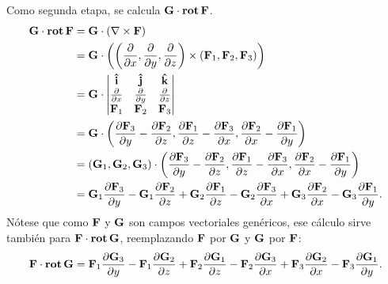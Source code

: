 \documentclass{fmbvecto}
\begin{document}
\begin{problema}
Como segunda etapa, se calcula \(\boldsymbol{{\mathbf{G}}}\cdot \operatorname{\mathbf{rot}}\boldsymbol{{\mathbf{F}}}\). 
\begin{align*}
    \bvec{G}\cdot \rot\bvec{F} &= \bvec{G} \cdot \left( \nabla \times \bvec{F} \right) \\
    &= \bvec{G} \cdot \left( \left(\frac{\partial}{\partial x},\frac{\partial}{\partial y},\frac{\partial}{\partial z}\right) \times (\bvec{F}_1, \bvec{F}_2, \bvec{F}_3) \right)\\
    &= \bvec{G} \cdot \begin{vmatrix}
        \uvec{i} & \uvec{j} & \uvec{k} \\
        \frac{\partial}{\partial x} & \frac{\partial}{\partial y} & \frac{\partial}{\partial z} \\
        \bvec{F}_1 & \bvec{F}_2 & \bvec{F}_3 \\
    \end{vmatrix} \\
    &= \bvec{G} \cdot \left( \frac{\partial \bvec{F}_3}{\partial y} - \frac{\partial \bvec{F}_2}{\partial z}, \frac{\partial \bvec{F}_1 }{\partial z} - \frac{\partial \bvec{F}_3}{\partial x}, \frac{\partial \bvec{F}_2}{\partial x} - \frac{\partial \bvec{F}_1 }{\partial y} \right) \\
    &= (\bvec{G}_1, \bvec{G}_2, \bvec{G}_3) \cdot \left( \frac{\partial \bvec{F}_3}{\partial y} - \frac{\partial \bvec{F}_2}{\partial z}, \frac{\partial \bvec{F}_1 }{\partial z} - \frac{\partial \bvec{F}_3}{\partial x}, \frac{\partial \bvec{F}_2}{\partial x} - \frac{\partial \bvec{F}_1 }{\partial y} \right) \\
    &= \bvec{G}_1 \frac{\partial \bvec{F}_3}{\partial y} - \bvec{G}_1\frac{\partial \bvec{F}_2}{\partial z} + \bvec{G}_2\frac{\partial \bvec{F}_1}{\partial z} - \bvec{G}_2\frac{\partial \bvec{F}_3}{\partial x} + \bvec{G}_3\frac{\partial \bvec{F}_2}{\partial x} - \bvec{G}_3\frac{\partial \bvec{F}_1}{\partial y}.
\end{align*}
Nótese que como \(\boldsymbol{{\mathbf{F}}}\) y \(\boldsymbol{{\mathbf{G}}}\) son campos vectoriales genéricos, ese cálculo sirve también para \(\boldsymbol{{\mathbf{F}}}\cdot \operatorname{\mathbf{rot}}\boldsymbol{{\mathbf{G}}}\), reemplazando \(\boldsymbol{{\mathbf{F}}}\) por \(\boldsymbol{{\mathbf{G}}}\) y \(\boldsymbol{{\mathbf{G}}}\) por \(\boldsymbol{{\mathbf{F}}}\):
\begin{equation*}
    \bvec{F}\cdot \rot\bvec{G} = \bvec{F}_1 \frac{\partial \bvec{G}_3}{\partial y} - \bvec{F}_1\frac{\partial \bvec{G}_2}{\partial z} + \bvec{F}_2\frac{\partial \bvec{G}_1}{\partial z} - \bvec{F}_2\frac{\partial \bvec{G}_3}{\partial x} + \bvec{F}_3\frac{\partial \bvec{G}_2}{\partial x} - \bvec{F}_3\frac{\partial \bvec{G}_1}{\partial y}.

\end{equation*}
\end{problema}
\end{document}
